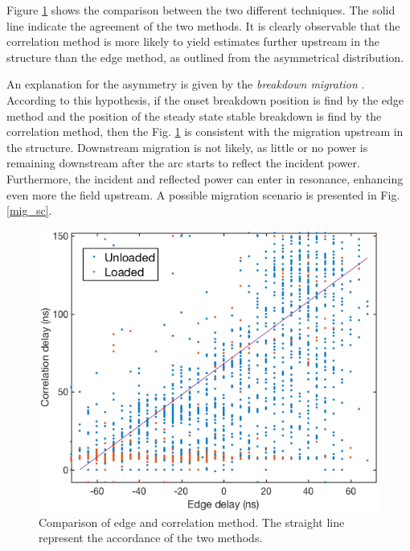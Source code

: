 Figure \ref{comp_corr_edge} shows the comparison between the two different techniques. The solid line indicate the agreement of the two methods. It is clearly observable that the correlation method is more likely to yield estimates further upstream in the structure than the edge method, as outlined from the asymmetrical distribution. 

An explanation for the asymmetry is given by the \textit{breakdown migration} \cite{Woolley:2015,Jacewicz:CLICWS16,Degiovanni:migration}. According to this hypothesis, if the onset breakdown position is find by the edge method and the position of the steady state stable breakdown is find by the correlation method, then the Fig. \ref{comp_corr_edge} is consistent with the migration upstream in the structure. Downstream migration is not likely, as little or no power is remaining downstream after the arc starts to reflect the incident power. Furthermore, the incident and reflected power can enter in resonance, enhancing even more the field upstream.
A possible migration scenario is presented in Fig. \ref{mig_sc}.

\begin{figure}[h]
\centering 
\includegraphics[scale=0.4]{pictures/methods_comparison.png}
\caption{Comparison of edge and correlation method. The straight line represent the accordance of the two methods.}
\label{comp_corr_edge}
\end{figure}

